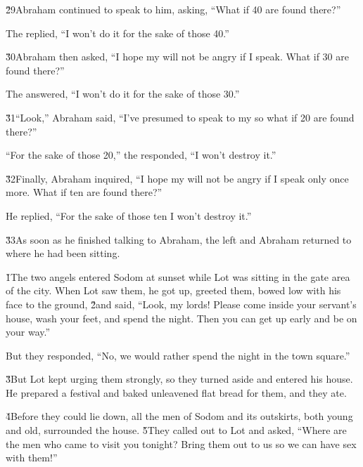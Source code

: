 \v{29}Abraham continued to speak to him, asking, ``What if 40 are found there?''

The  replied, ``I won't do it for the sake of those 40.''

\v{30}Abraham then asked, ``I hope my  will not be angry if I speak. What if 30 are found there?''

The  answered, ``I won't do it for the sake of those 30.''

\v{31}``Look,'' Abraham said, ``I've presumed to speak to my  so what if 20 are found there?''

``For the sake of those 20,'' the  responded, ``I won't destroy it.''

\v{32}Finally, Abraham inquired, ``I hope my  will not be angry if I speak only once more. What if ten are found there?''

He replied, ``For the sake of those ten I won't destroy it.''

\v{33}As soon as he finished talking to Abraham, the  left and Abraham returned to where he had been sitting.

\v{1}The two angels entered Sodom at sunset while Lot was sitting in the gate area of the city. When Lot saw them, he got up, greeted them, bowed low with his face to the ground, \v{2}and said, ``Look, my lords! Please come inside your servant's house, wash your feet, and spend the night. Then you can get up early and be on your way.''

But they responded, ``No, we would rather spend the night in the town square.''

\v{3}But Lot kept urging them strongly, so they turned aside and entered his house. He prepared a festival and baked unleavened flat bread for them, and they ate.

\v{4}Before they could lie down, all the men of Sodom and its outskirts, both young and old, surrounded the house. \v{5}They called out to Lot and asked, ``Where are the men who came to visit you tonight? Bring them out to us so we can have sex with them!''

